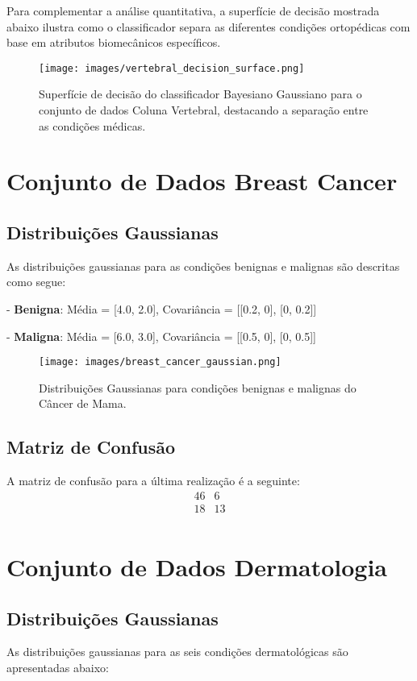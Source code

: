 \documentclass[12pt, a4paper]{report}
\begin{document}
Para complementar a análise quantitativa, a superfície de decisão mostrada abaixo ilustra como o classificador separa as diferentes condições ortopédicas com base em atributos biomecânicos específicos.

\begin{figure}[H]
\centering
\texttt{[image: images/vertebral\_decision\_surface.png]}
\caption{Superfície de decisão do classificador Bayesiano Gaussiano para o conjunto de dados Coluna Vertebral, destacando a separação entre as condições médicas.}
\label{fig:spine_decision_surface}
\end{figure}

\section{Conjunto de Dados Breast Cancer}

\subsection{Distribuições Gaussianas}
As distribuições gaussianas para as condições benignas e malignas são descritas como segue:

- \textbf{Benigna}: Média = [4.0, 2.0], Covariância = [[0.2, 0], [0, 0.2]]

- \textbf{Maligna}: Média = [6.0, 3.0], Covariância = [[0.5, 0], [0, 0.5]]

\begin{figure}[H]
\centering
\texttt{[image: images/breast\_cancer\_gaussian.png]}
\caption{Distribuições Gaussianas para condições benignas e malignas do Câncer de Mama.}
\label{fig:gaussian_breast_cancer}
\end{figure}

\subsection{Matriz de Confusão}
A matriz de confusão para a última realização é a seguinte:
\[
\begin{array}{cc}
46 & 6 \\
18 & 13 \\
\end{array}
\]

\section{Conjunto de Dados Dermatologia}

\subsection{Distribuições Gaussianas}
As distribuições gaussianas para as seis condições dermatológicas são apresentadas abaixo:
\end{document}
